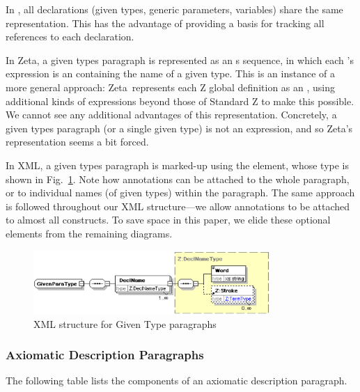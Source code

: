 \documentclass{llncs}  %
\newcommand{\Zeta}{Zeta}
\begin{document}
In \CADiZ, all declarations
(given types, generic parameters, variables)
share the same  representation.
This has the advantage of providing a basis for
tracking all references to each declaration.

In \Zeta, a given types paragraph is represented as
an s sequence,
in which each 's expression
is an  containing the name of a given type.
This is an instance of a more general approach:
\Zeta\ represents each Z global definition as an ,
using additional kinds of expressions beyond those of Standard Z
to make this possible.
We cannot see any additional advantages of this representation.
Concretely, a given types paragraph (or a single given type) is not an
expression, and so \Zeta's representation seems a bit forced. 

In XML, a given types paragraph is marked-up using
the  element, whose type is shown in Fig.~\ref{fig:givenpara}.
Note how annotations can be attached to the whole paragraph,
or to individual names (of given types) within the paragraph.
The same approach is followed throughout our XML structure---we allow
annotations to be attached to almost all constructs.  To save space in this
paper, we elide these optional  elements from the remaining
diagrams. 

\begin{figure}[htbp]
  \centering
  \includegraphics[width=0.8\textwidth]{givenparatype-anns.eps}
  \caption{XML structure for Given Type paragraphs}
  \label{fig:givenpara}
\end{figure}


\subsubsection{Axiomatic Description Paragraphs}

The following table lists the components of an axiomatic description paragraph.
\end{document}
